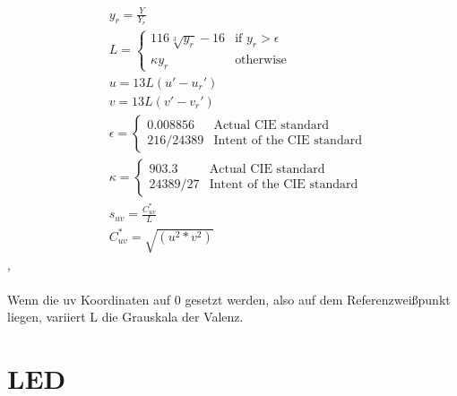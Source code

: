 \documentclass[11pt]{scrartcl}
\begin{document}
\begin{align}\label{Equ:10}
    &y_r = \frac{Y}{Y_r}\\
    &L = \left\{
        \begin{array}{ll}
            116 \sqrt[3]{y_r} - 16 & \text{if } y_r > \epsilon \\
            \kappa y_r & \text{otherwise}
        \end{array}
        \right.\\
    &u = 13 L (u' - u_r')\\
    &v = 13 L (v' - v_r')\\
    &\epsilon = \left\{
        \begin{array}{ll}
            {0.008856} & \text{Actual CIE standard} \\
            {216 / 24389} & \text{Intent of the CIE standard}
        \end{array}
        \right.\\
    &\kappa = \left\{
        \begin{array}{ll}
            {903.3} & \text{Actual CIE standard} \\
            {24389 / 27} & \text{Intent of the CIE standard}
        \end{array}
        \right.\\
    &s_{uv} = \frac{C^*_{uv}}{L}\\
    &C^*_{uv} = \sqrt{(u^2*v^2)}
\end{align}
\cite{lindbloom}, \cite{wikipedia1976}\\
\\
Wenn die uv Koordinaten auf 0 gesetzt werden, also auf dem Referenzweißpunkt liegen, variiert L die Grauskala der Valenz. \cite{wisotopLuv}
\clearpage

\section{LED}
\end{document}

